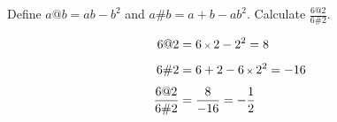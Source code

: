 Define $a@b=ab-b^{2}$ and $a\#b=a+b-ab^{2}$. Calculate $\displaystyle\frac{6@2}{6\#2}$.

\begin{align*}
6@2 
& = 6 \operatorname{\mbox{\scriptsize$\times$}} 2 - 2^{2}
  = 8
\\[1ex]
6\#2
& = 6 + 2 - 6 \operatorname{\mbox{\scriptsize$\times$}} 2^{2}
  = - 16
\\[1ex]
\frac{6@2}{6\#2}
& = \frac{8}{-16}
  = - \frac{1}{2}
\end{align*}
